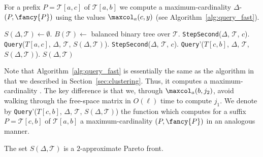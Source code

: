 For a prefix $P = \mathcal{T}[a, c]$ of $\mathcal{T}[a, b]$ we compute a maximum-cardinality $\Delta$-\pathlet $(P, {\fancy{P}})$ using the values $\maxcol_a(c, y)$ (see Algorithm~\ref{alg:query_fast}). 
%
%
%
%
 \begin{algorithm}[b]
    \caption{\textbf{PSC}($\Delta$, $\mathcal{T}$)}
    \label{alg:PSC}
    \begin{algorithmic}
    \State $S(\Delta, \mathcal{T}) \gets \emptyset$.
    \State $B(\mathcal{T}) \gets$ balanced binary tree over $\mathcal{T}$.
    \State \texttt{StepSecond}($\Delta$, $\mathcal{T}$, $c$).
    \State \texttt{Query}($T[a, c]$, $\Delta$, $\mathcal{T}$, $S(\Delta, \mathcal{T})$).
    \EndFor
    \State \texttt{StepSecond}($\Delta$, $\mathcal{T}$, $c$).
    \State \texttt{Query}'($T[c, b]$, $\Delta$, $\mathcal{T}$, $S(\Delta, \mathcal{T})$).
    \EndFor
    \EndFor
    \State \Return $S(\Delta, \mathcal{T})$
    \end{algorithmic}
  \end{algorithm}
%
%
%
%
Note that Algorithm~\ref{alg:query_fast} is essentially the same as the algorithm in~\cite{buchin2011detecting} that we described in Section~\ref{sec:clustering}. 
Thus, it computes a maximum-cardinality \pathlet.
The key difference is that we, through $\maxcol_a(b,j_2)$,  avoid walking through the free-space matrix in $O(\ell)$ time to compute $j_1$.  
We denote by  \texttt{Query}'($T[c, b]$, $\Delta$, $\mathcal{T}$, $S(\Delta, \mathcal{T})$) the function which computes for a suffix $P = \mathcal{T}[c, b]$ of $\mathcal{T}[a, b]$ a maximum-cardinality \pathlet  $(P, {\fancy{P}})$ in an analogous manner. 
%
\begin{lemma}
    The set $S(\Delta, \mathcal{T})$ is a $2$-approximate Pareto front. 
\end{lemma}
%
